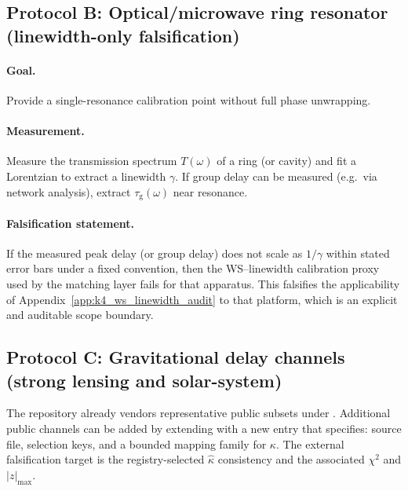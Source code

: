 \subsection{Protocol B: Optical/microwave ring resonator (linewidth-only falsification)}
\label{subsec:k4_falsify_resonator}

\paragraph{Goal.}
Provide a single-resonance calibration point without full phase unwrapping.

\paragraph{Measurement.}
Measure the transmission spectrum $T(\omega)$ of a ring (or cavity) and fit a Lorentzian to extract a linewidth $\gamma$.
If group delay can be measured (e.g.\ via network analysis), extract $\tau_{\mathrm{g}}(\omega)$ near resonance.

\paragraph{Falsification statement.}
If the measured peak delay (or group delay) does not scale as $1/\gamma$ within stated error bars under a fixed convention, then the WS--linewidth calibration proxy used by the matching layer fails for that apparatus.
This falsifies the applicability of Appendix~\ref{app:k4_ws_linewidth_audit} to that platform, which is an explicit and auditable scope boundary.

\subsection{Protocol C: Gravitational delay channels (strong lensing and solar-system)}
\label{subsec:k4_falsify_gravdelay}

The repository already vendors representative public subsets under .
Additional public channels can be added by extending  with a new entry that specifies:
source file, selection keys, and a bounded mapping family for $\kappa$.
The external falsification target is the registry-selected $\widehat{\kappa}$ consistency and the associated $\chi^2$ and $|z|_{\max}$.

